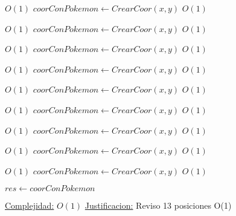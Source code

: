 \begin{Algoritmos}
\begin{algorithmic}[1]
             \Comment $O(1)$
            \State $coorConPokemon \gets CrearCoor(x, y)$    \Comment $O(1)$
        \EndIf
    \EndIf

\EndIf


         \Comment $O(1)$
        \State $coorConPokemon \gets CrearCoor(x, y)$    \Comment $O(1)$
    \EndIf


             \Comment $O(1)$
            \State $coorConPokemon \gets CrearCoor(x, y)$    \Comment $O(1)$
        \EndIf

    \EndIf

\EndIf


         \Comment $O(1)$
        \State $coorConPokemon \gets CrearCoor(x, y)$    \Comment $O(1)$
    \EndIf


             \Comment $O(1)$
            \State $coorConPokemon \gets CrearCoor(x, y)$    \Comment $O(1)$
        \EndIf


    \EndIf

\EndIf

         \Comment $O(1)$
        \State $coorConPokemon \gets CrearCoor(x, y)$    \Comment $O(1)$
        \EndIf

             \Comment $O(1)$
            \State $coorConPokemon \gets CrearCoor(x, y)$    \Comment $O(1)$
        \EndIf
    \EndIf

             \Comment $O(1)$
            \State $coorConPokemon \gets CrearCoor(x, y)$    \Comment $O(1)$
        \EndIf

    \EndIf
\EndIf

         \Comment $O(1)$
        \State $coorConPokemon \gets CrearCoor(x, y)$    \Comment $O(1)$
    \EndIf
\EndIf

\State $res \gets coorConPokemon$

\medskip
\State \underline{Complejidad:} $O(1)$ %
\State \underline{Justificacion:} Reviso 13 posiciones O(1)


\end{algorithmic}
\end{Algoritmos}
